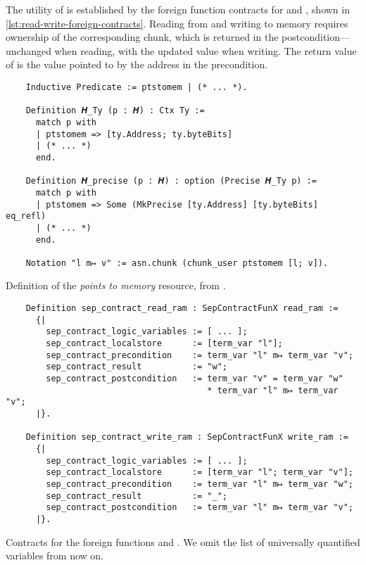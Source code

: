 The utility of  is established by the foreign function contracts for  and , shown in \cref{lst:read-write-foreign-contracts}. Reading from and writing to memory requires ownership of the corresponding  chunk, which is returned in the postcondition---unchanged when reading, with the updated value when writing. The return value of  is the value pointed to by the address in the precondition.

\begin{listing}[h]
  \begin{verbatim}
    Inductive Predicate := ptstomem | (* ... *).

    Definition 𝑯_Ty (p : 𝑯) : Ctx Ty :=
      match p with
      | ptstomem => [ty.Address; ty.byteBits]
      | (* ... *)
      end.

    Definition 𝑯_precise (p : 𝑯) : option (Precise 𝑯_Ty p) :=
      match p with
      | ptstomem => Some (MkPrecise [ty.Address] [ty.byteBits] eq_refl)
      | (* ... *)
      end.

    Notation "l m↦ v" := asn.chunk (chunk_user ptstomem [l; v]).
  \end{verbatim}
  \caption{Definition of the \emph{points to memory} resource, from .}
  \label{lst:ptstomem}
\end{listing}

\begin{listing}[t]
  \begin{verbatim}
    Definition sep_contract_read_ram : SepContractFunX read_ram :=
      {|
        sep_contract_logic_variables := [ ... ];
        sep_contract_localstore      := [term_var "l"];
        sep_contract_precondition    := term_var "l" m↦ term_var "v";
        sep_contract_result          := "w";
        sep_contract_postcondition   := term_var "v" = term_var "w"
                                        * term_var "l" m↦ term_var "v";
      |}.

    Definition sep_contract_write_ram : SepContractFunX write_ram :=
      {|
        sep_contract_logic_variables := [ ... ];
        sep_contract_localstore      := [term_var "l"; term_var "v"];
        sep_contract_precondition    := term_var "l" m↦ term_var "w";
        sep_contract_result          := "_";
        sep_contract_postcondition   := term_var "l" m↦ term_var "v";
      |}.
  \end{verbatim}
  \caption{Contracts for the foreign functions  and . We omit the list of universally quantified variables from now on.}
  \label{lst:read-write-foreign-contracts}
\end{listing}

